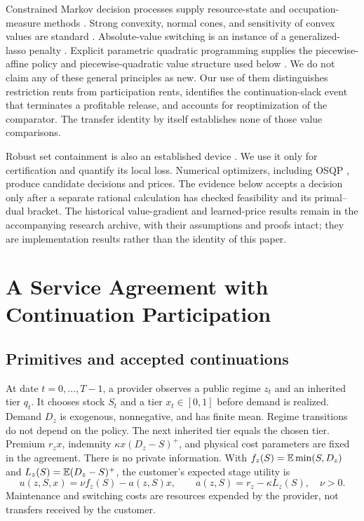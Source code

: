 \documentclass[11pt,letterpaper]{article}
\theoremstyle{definition}\newtheorem{assumption}[theorem]{Assumption}
\begin{document}
Constrained Markov decision processes supply resource-state and occupation-measure methods \citep{Altman1999}. Strong convexity, normal cones, and sensitivity of convex values are standard \citep{BoydVandenberghe2004}. Absolute-value switching is an instance of a generalized-lasso penalty \citep{TibshiraniTaylor2011}. Explicit parametric quadratic programming supplies the piecewise-affine policy and piecewise-quadratic value structure used below \citep{Bemporad2002}. We do not claim any of these general principles as new. Our use of them distinguishes restriction rents from participation rents, identifies the continuation-slack event that terminates a profitable release, and accounts for reoptimization of the comparator. The transfer identity by itself establishes none of those value comparisons.

Robust set containment is also an established device \citep{BenTalNemirovski2000,BertsimasSim2004}. We use it only for certification and quantify its local loss. Numerical optimizers, including OSQP \citep{Stellato2020}, produce candidate decisions and prices. The evidence below accepts a decision only after a separate rational calculation has checked feasibility and its primal--dual bracket. The historical value-gradient and learned-price results remain in the accompanying research archive, with their assumptions and proofs intact; they are implementation results rather than the identity of this paper.


\section{A Service Agreement with Continuation Participation}\label{sec:model}
\subsection{Primitives and accepted continuations}
At date $t=0,\ldots,T-1$, a provider observes a public regime $z_t$ and an inherited tier $q_t$. It chooses stock $S_t$ and a tier $x_t\in[0,1]$ before demand is realized. Demand $D_z$ is exogenous, nonnegative, and has finite mean. Regime transitions do not depend on the policy. The next inherited tier equals the chosen tier. Premium $r_zx$, indemnity $\kappa x(D_z-S)^+$, and physical cost parameters are fixed in the agreement. There is no private information. With $f_z(S)=\mathbb E\min(S,D_z)$ and $L_z(S)=\mathbb E(D_z-S)^+$, the customer's expected stage utility is
\begin{equation}\label{eq:customer}
 u(z,S,x)=\nu f_z(S)-a(z,S)x,\qquad a(z,S)=r_z-\kappa L_z(S),\quad \nu>0.
\end{equation}
Maintenance and switching costs are resources expended by the provider, not transfers received by the customer.
\end{document}
